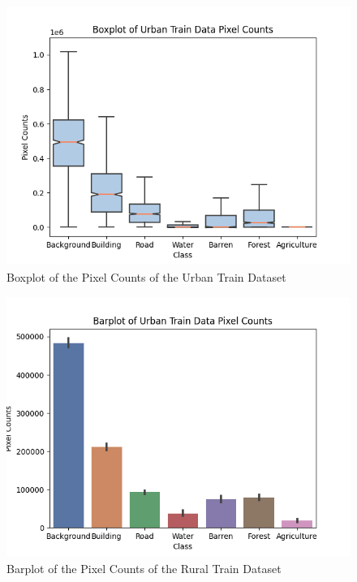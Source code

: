 \begin{figure}[!h]
\includegraphics[width=15.0cm, height=8.5cm]{images/urban train boxplot.png}
\centering
\caption{Boxplot of the Pixel Counts of the Urban Train Dataset}
\label{fig:boxplot-urban-train}
\end{figure}

\begin{figure}[!h]
\includegraphics[width=15.0cm, height=8.5cm]{images/urban train barplot.png}
\centering
\caption{Barplot of the Pixel Counts of the Rural Train Dataset}
\label{fig:barplot-urban-train}
\end{figure}



